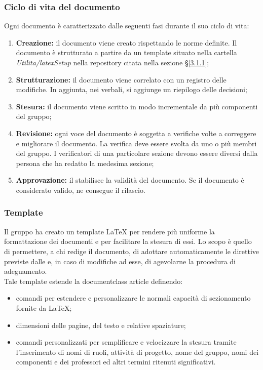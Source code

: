 \subsubsection{Ciclo di vita del documento}
Ogni documento è caratterizzato dalle seguenti fasi durante il suo ciclo di vita:
\begin{enumerate}
	\item \textbf{Creazione:} il documento viene creato rispettando le norme definite. Il documento è strutturato a partire da un template situato nella cartella \textit{Utilita/latexSetup} nella repository citata nella sezione §\ref{3.1.1};
	\item \textbf{Strutturazione:} il documento viene correlato con un registro delle modifiche. In aggiunta, nei verbali, si aggiunge un riepilogo delle decisioni;
	\item \textbf{Stesura:} il documento viene scritto in modo incrementale da più componenti del gruppo;
	\item \textbf{Revisione:} ogni voce del documento è soggetta a verifiche volte a correggere e migliorare il documento. La verifica deve essere svolta da uno o più membri del gruppo. I verificatori di una particolare sezione devono essere diversi dalla persona che ha redatto la medesima sezione;
	\item \textbf{Approvazione:} il \respProg{} stabilisce la validità del documento. Se il documento è considerato valido, ne consegue il rilascio.
\end{enumerate}

\subsubsection{Template}
Il gruppo ha creato un template \LaTeX{} per rendere più uniforme la formattazione dei documenti e per facilitare la stesura di essi. Lo scopo è quello di permettere, a chi redige il documento, di adottare automaticamente le direttive previste dalle \NdPv{} e, in caso di modifiche ad esse, di agevolarne la procedura di adeguamento. \\
Tale template estende la documentclass article definendo:
\begin{itemize}
	\item comandi per estendere e personalizzare le normali capacità di sezionamento fornite da \LaTeX ;
	\item dimensioni delle pagine, del testo e relative spaziature;
	\item comandi personalizzati per semplificare e velocizzare la stesura tramite l'inserimento di nomi di ruoli, attività di progetto, nome del gruppo, nomi dei componenti e dei professori ed altri termini ritenuti significativi. 
\end{itemize}








